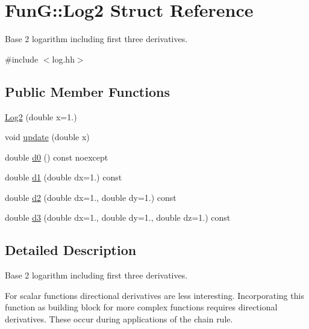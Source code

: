 \hypertarget{structFunG_1_1Log2}{\section{\-Fun\-G\-:\-:\-Log2 \-Struct \-Reference}
\label{structFunG_1_1Log2}
}


\-Base 2 logarithm including first three derivatives.  




{\ttfamily \#include $<$log.\-hh$>$}

\subsection*{\-Public \-Member \-Functions}
\begin{DoxyCompactItemize}
\item 
\hyperlink{structFunG_1_1Log2_ab3fe35bf3d976e51797bff7128d2f16b}{\-Log2} (double x=1.)
\item 
void \hyperlink{structFunG_1_1Log2_a2052168d207ca31e00620238c71b94f3}{update} (double x)
\item 
double \hyperlink{structFunG_1_1Log2_a11b6311bb395c3e77cdb874ec2eab240}{d0} () const noexcept
\item 
double \hyperlink{structFunG_1_1Log2_ab8d1169c44c1940953c19e85e292a9b9}{d1} (double dx=1.) const 
\item 
double \hyperlink{structFunG_1_1Log2_aa90f4f3ccfca5cff8d6027a04fae1ea1}{d2} (double dx=1., double dy=1.) const 
\item 
double \hyperlink{structFunG_1_1Log2_a9012b223a7cc98604bcb3acd756b3902}{d3} (double dx=1., double dy=1., double dz=1.) const 
\end{DoxyCompactItemize}


\subsection{\-Detailed \-Description}
\-Base 2 logarithm including first three derivatives. 

\-For scalar functions directional derivatives are less interesting. \-Incorporating this function as building block for more complex functions requires directional derivatives. \-These occur during applications of the chain rule. 

